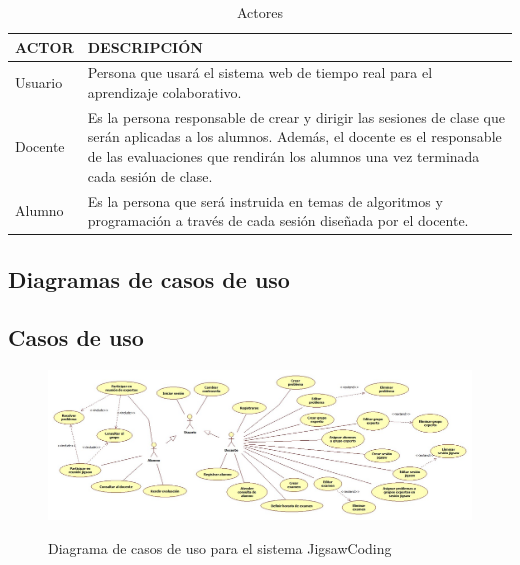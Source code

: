 \begin{longtable}{|L{3cm}|L{7cm}|}
\caption{Actores}
\label{tab:actores}\\
    \hline
    ACTOR & DESCRIPCIÓN \\
    \hline
    Usuario & Persona que usará el sistema web de tiempo real para el aprendizaje colaborativo.\\
    \hline
    Docente & Es la persona responsable de crear y dirigir las sesiones de clase que serán aplicadas a los alumnos. Además, el docente es el responsable de las evaluaciones que rendirán los alumnos una vez terminada cada sesión de clase.\\
    \hline
    Alumno & Es la persona que será instruida en temas de algoritmos y programación a través de cada sesión diseñada por el docente.\\
    \hline
\end{longtable}
\clearpage
\begin{landscape}
\section{Diagramas de casos de uso}
\subsection{Casos de uso}
\begin{figure}[!h]
  \centering
  \includegraphics[scale=0.45]{figuras/casosdeuso/casos_de_uso.jpg}\\
  \caption[Casos de uso]{Diagrama de casos de uso para el sistema JigsawCoding}
  \label{fig:casos_de_uso}
\end{figure}
\end{landscape}
\clearpage
